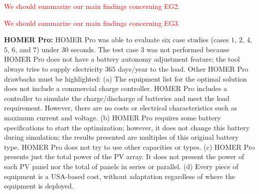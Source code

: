 \documentclass[journal]{IEEEtran}
\begin{document}
\begin{tcolorbox}
\textcolor{red}{We should summarize our main findings concerning EG2.}
\end{tcolorbox}


\begin{tcolorbox}
\textcolor{red}{We should summarize our main findings concerning EG3.}
\end{tcolorbox}

\textbf{HOMER Pro:} HOMER Pro was able to evaluate six case studies (cases $1$, $2$, $4$, $5$, $6$, and $7$) under $30$ seconds. The test case $3$ was not performed because HOMER Pro does not have a battery autonomy adjustment feature; the tool always tries to supply electricity $365$ days/year to the load. Other HOMER Pro drawbacks must be highlighted: (a) The equipment list for the optimal solution does not include a commercial charge controller. HOMER Pro includes a controller to simulate the charge/discharge of batteries and meet the load requirement. However, there are no costs or electrical characteristics such as maximum current and voltage. (b) HOMER Pro requires some battery specifications to start the optimization; however, it does not change this battery during simulation; the results presented are multiples of this original battery type. HOMER Pro does not try to use other capacities or types. (c) HOMER Pro presents just the total power of the PV array. It does not present the power of each PV panel nor the total of panels in series or parallel. (d) Every piece of equipment is a USA-based cost, without adaptation regardless of where the equipment is deployed.
\end{document}

